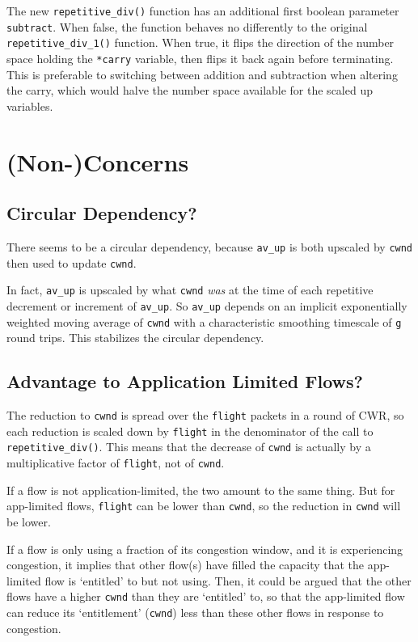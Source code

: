 The new \texttt{repetitive\_div()} function has an additional first boolean parameter \texttt{subtract}. When false, the function behaves no differently to the original \texttt{repetitive\_div\_1()} function. When true, it flips the direction of the number space holding the \texttt{*carry} variable, then flips it back again before terminating. This is preferable to switching between addition and subtraction when altering the carry, which would halve the number space available for the scaled up variables.

\section{(Non-)Concerns}\label{prresp_Non-Concerns}

\subsection{Circular Dependency?}\label{prresp_No_Circular_Dependency}

There seems to be a circular dependency, because \texttt{av\_up} is both upscaled by \texttt{cwnd} then used to update \texttt{cwnd}.

In fact, \texttt{av\_up} is upscaled by what \texttt{cwnd} \emph{was} at the time of each repetitive decrement or increment of \texttt{av\_up}. So  \texttt{av\_up} depends on an implicit exponentially weighted moving average of \texttt{cwnd} with a characteristic smoothing timescale of \texttt{g} round trips. This stabilizes the circular dependency.

\subsection{Advantage to Application Limited Flows?}\label{prresp_Advantage_App-Limited}

The reduction to \texttt{cwnd} is spread over the \texttt{flight} packets in a round of CWR, so each reduction is scaled down by \texttt{flight} in the denominator of the call to \texttt{repetitive\_div()}. This means that the decrease of \texttt{cwnd} is actually by a multiplicative factor of \texttt{flight}, not of \texttt{cwnd}.

If a flow is not application-limited, the two amount to the same thing. But for app-limited flows, \texttt{flight} can be lower than \texttt{cwnd}, so the reduction in \texttt{cwnd} will be lower.

If a flow is only using a fraction of its congestion window, and it is experiencing congestion, it implies that other flow(s) have filled the capacity that the app-limited flow is `entitled' to but not using. Then, it could be argued that the other flows have a higher \texttt{cwnd} than they are `entitled' to, so that the app-limited flow can reduce its `entitlement' (\texttt{cwnd}) less than these other flows in response to congestion.

